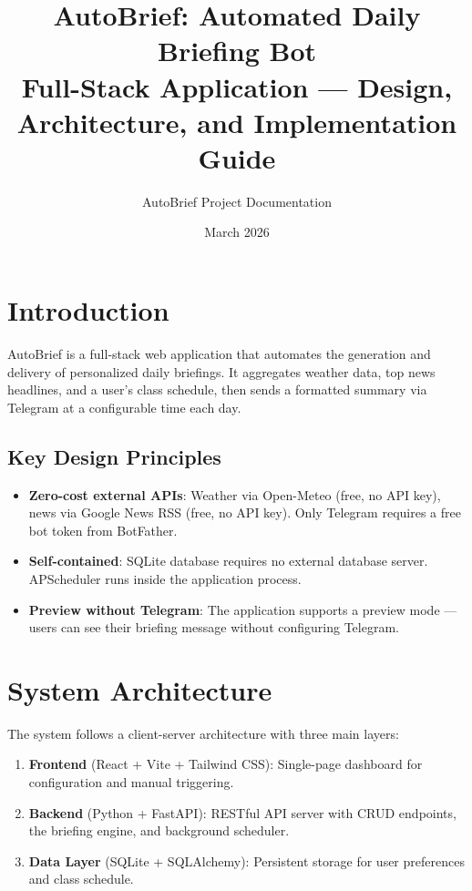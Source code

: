 \documentclass[12pt, a4paper]{article}
\title{%
  \textbf{AutoBrief: Automated Daily Briefing Bot}\\[0.5em]
  \large Full-Stack Application --- Design, Architecture, and Implementation Guide
}
\author{AutoBrief Project Documentation}
\date{March 2026}
\begin{document}
\maketitle
\tableofcontents
\newpage

\section{Introduction}

AutoBrief is a full-stack web application that automates the generation and delivery of personalized daily briefings. It aggregates weather data, top news headlines, and a user's class schedule, then sends a formatted summary via Telegram at a configurable time each day.

\subsection{Key Design Principles}

\begin{itemize}[leftmargin=2em]
  \item \textbf{Zero-cost external APIs}: Weather via Open-Meteo (free, no API key), news via Google News RSS (free, no API key). Only Telegram requires a free bot token from BotFather.
  \item \textbf{Self-contained}: SQLite database requires no external database server. APScheduler runs inside the application process.
  \item \textbf{Preview without Telegram}: The application supports a preview mode --- users can see their briefing message without configuring Telegram.
\end{itemize}

\section{System Architecture}

The system follows a client-server architecture with three main layers:

\begin{enumerate}[leftmargin=2em]
  \item \textbf{Frontend} (React + Vite + Tailwind CSS): Single-page dashboard for configuration and manual triggering.
  \item \textbf{Backend} (Python + FastAPI): RESTful API server with CRUD endpoints, the briefing engine, and background scheduler.
  \item \textbf{Data Layer} (SQLite + SQLAlchemy): Persistent storage for user preferences and class schedule.
\end{enumerate}
\end{document}
